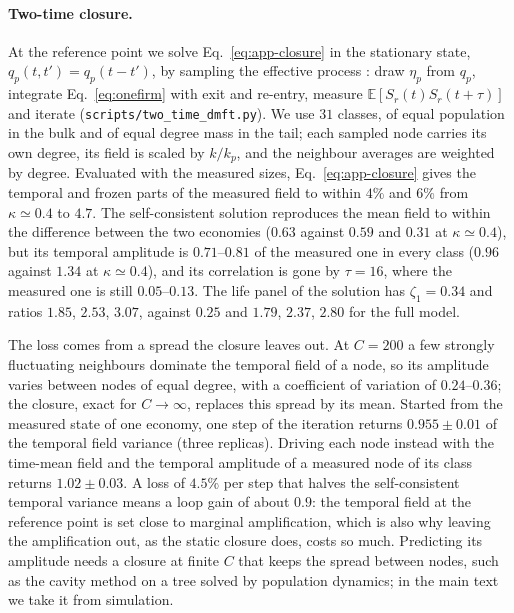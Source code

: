 \documentclass[pre,twocolumn,superscriptaddress,nofootinbib]{revtex4-2}
\newcommand{\E}{\mathbb E}
\begin{document}
\paragraph{Two-time closure.}  At the reference point we solve Eq.~\eqref{eq:app-closure} in the stationary
state, $q_p(t,t')=q_p(t-t')$, by sampling the effective process \cite{eissfeller1992,roy2019}: draw $\eta_p$ from
$q_p$, integrate Eq.~\eqref{eq:onefirm} with exit and re-entry, measure $\E[S_r(t)S_r(t+\tau)]$ and iterate
(\texttt{scripts/two\_time\_dmft.py}).  We use $31$ classes, of equal population in the bulk and of equal degree
mass in the tail; each sampled node carries its own degree, its field is scaled by $k/k_p$, and the
neighbour averages are weighted by degree.  Evaluated with the measured sizes, Eq.~\eqref{eq:app-closure}
gives the temporal and frozen parts of the measured field to within $4\%$ and $6\%$ from $\kappa\simeq0.4$ to
$4.7$.  The self-consistent solution reproduces the mean field to within the difference between the two
economies ($0.63$ against $0.59$ and $0.31$ at $\kappa\simeq0.4$), but its temporal amplitude is $0.71$--$0.81$ of
the measured one in every class ($0.96$ against $1.34$ at $\kappa\simeq0.4$), and its correlation is gone by
$\tau=16$, where the measured one is still $0.05$--$0.13$.  The life panel of the solution has $\zeta_1=0.34$
and ratios $1.85$, $2.53$, $3.07$, against $0.25$ and $1.79$, $2.37$, $2.80$ for the full model.

The loss comes from a spread the closure leaves out.  At $C=200$ a few strongly fluctuating neighbours
dominate the temporal field of a node, so its amplitude varies between nodes of equal degree, with a
coefficient of variation of $0.24$--$0.36$; the closure, exact for $C\to\infty$, replaces this spread by its
mean.  Started from the measured state of one economy, one step of the iteration returns $0.955\pm0.01$ of
the temporal field variance (three replicas).  Driving each node instead with the time-mean field and the
temporal amplitude of a measured node of its class returns $1.02\pm0.03$.  A loss of $4.5\%$ per step
that halves the self-consistent temporal variance means a loop gain of about $0.9$: the temporal field at
the reference point is set close to marginal amplification, which is also why leaving the amplification
out, as the static closure does, costs so much.  Predicting its amplitude needs a closure at finite $C$ that keeps the spread
between nodes, such as the cavity method on a tree solved by population dynamics; in the main text we
take it from simulation.
\end{document}
